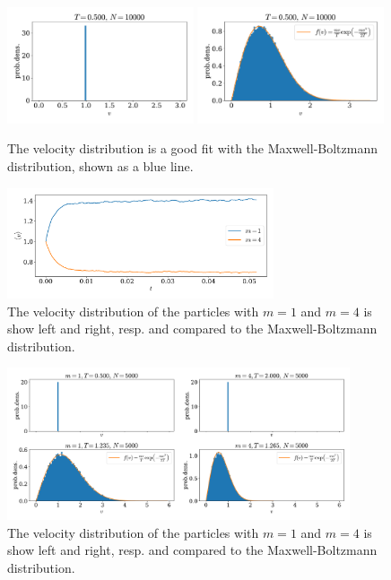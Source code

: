 \documentclass{article}
\begin{document}
    \begin{figure}[H]
        \centering
        \includegraphics[width=0.49\textwidth]{../plots/problem1/2/vel_dist.pdf}
        \includegraphics[width=0.49\textwidth]{../plots/problem1/vel_dist.pdf}
        \caption{The velocity distribution is a good fit with the Maxwell-Boltzmann distribution, shown as a blue line.}
        \label{problem1 dist}
    \end{figure}
    \begin{figure}[H]
        \centering
        \includegraphics[width=0.7\textwidth]{../plots/problem2/v_av.pdf}
        \caption{The velocity distribution of the particles with $m=1$ and $m=4$ is show left and right, resp.
        and compared to the Maxwell-Boltzmann distribution.}
        \label{problem2 av vel}
    \end{figure}
    \begin{figure}[H]
        \centering
        \includegraphics[width=0.9\textwidth]{../plots/problem2/vel_dist.pdf}
        \caption{The velocity distribution of the particles with $m=1$ and $m=4$ is show left and right, resp.
        and compared to the Maxwell-Boltzmann distribution.}
        \label{problem2 dist}
    \end{figure}
 
\end{document}
